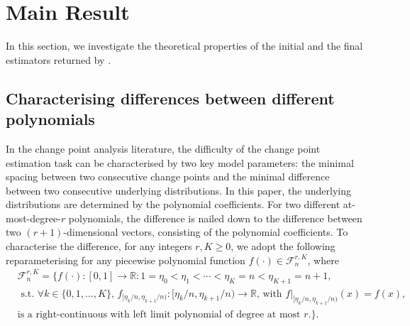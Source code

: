 \documentclass{article}
\begin{document}
\section{Main Result}\label{sec-main-result}

In this section, we investigate the theoretical properties of the initial and the final estimators returned by .  

\subsection{Characterising differences between different polynomials}

In the change point analysis literature, the difficulty of the change point estimation task can be characterised by two key model parameters: the minimal spacing between two consecutive change points and the minimal difference between two consecutive underlying distributions.  In this paper, the underlying distributions are determined by the polynomial coefficients.  For two different at-most-degree-$r$ polynomials, the difference is nailed down to the difference between two $(r+1)$-dimensional vectors, consisting of the polynomial coefficients.  To characterise the difference, for any integers $r, K \geq 0$, we adopt the following reparameterising for any piecewise polynomial function $f(\cdot) \in \mathcal{F}^{r, K}_n$, where
	\begin{align}
		& \mathcal{F}_n^{r, K}  = \Big\{f(\cdot): [0, 1] \to \mathbb{R}: 1 = \eta_0 < \eta_1 < \cdots < \eta_K = n < \eta_{K+1} = n+1, \nonumber \\
		& \mbox{ s.t. } \forall k \in \{0, 1, \ldots, K\}, \, f_{[\eta_k/n, \eta_{k+1}/n)}: [\eta_k/n, \eta_{k+1}/n) \to \mathbb{R}, \, \mbox{with } f|_{[\eta_k/n, \eta_{k+1}/n)}(x) = f(x), \nonumber \\
		& \mbox{is a right-continuous with left limit polynomial of degree at most } r.\Big\}. \label{eq-def-f-r-n-k}
	\end{align}
\end{document}
